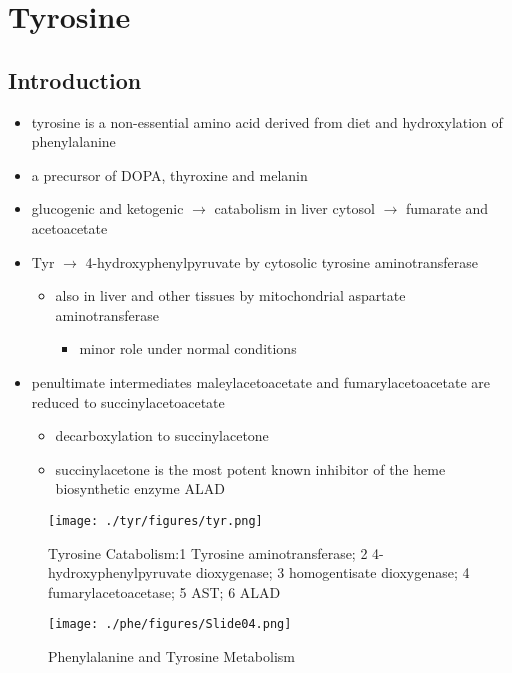 \documentclass{scrartcl}
\begin{document}
\section{Tyrosine}
\label{sec:org2704943}
\subsection{Introduction}
\label{sec:orgf9cb492}

\begin{itemize}
\item tyrosine is a non-essential amino acid derived from diet and hydroxylation of phenylalanine
\item a precursor of DOPA, thyroxine and melanin
\item glucogenic and ketogenic \(\to\) catabolism in liver cytosol \(\to\) fumarate and acetoacetate
\item Tyr \(\to\) 4-hydroxyphenylpyruvate by cytosolic tyrosine aminotransferase
\begin{itemize}
\item also in liver and other tissues by mitochondrial aspartate aminotransferase
\begin{itemize}
\item minor role under normal conditions
\end{itemize}
\end{itemize}
\item penultimate intermediates maleylacetoacetate and fumarylacetoacetate
are reduced to succinylacetoacetate
\begin{itemize}
\item decarboxylation to succinylacetone
\item succinylacetone is the most potent known inhibitor of the heme biosynthetic enzyme ALAD
\end{itemize}
\end{itemize}

\begin{figure}[htbp]
\centering
\texttt{[image: ./tyr/figures/tyr.png]}
\caption{\label{fig:org0c0a8ab}
Tyrosine Catabolism:1 Tyrosine aminotransferase; 2 4-hydroxyphenylpyruvate dioxygenase; 3 homogentisate dioxygenase; 4 fumarylacetoacetase; 5 AST; 6 ALAD}
\end{figure}


\begin{figure}[htbp]
\centering
\texttt{[image: ./phe/figures/Slide04.png]}
\caption{\label{fig:org844b254}
Phenylalanine and Tyrosine Metabolism}
\end{figure}
\end{document}
